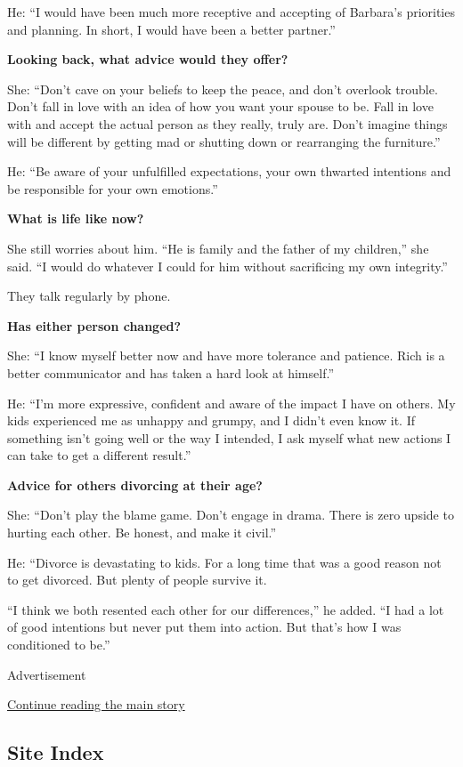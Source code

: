 He: ``I would have been much more receptive and accepting of Barbara's
priorities and planning. In short, I would have been a better partner.''

\textbf{Looking back, what advice would they offer?}

She: ``Don't cave on your beliefs to keep the peace, and don't overlook
trouble. Don't fall in love with an idea of how you want your spouse to
be. Fall in love with and accept the actual person as they really, truly
are. Don't imagine things will be different by getting mad or shutting
down or rearranging the furniture.''

He: ``Be aware of your unfulfilled expectations, your own thwarted
intentions and be responsible for your own emotions.''

\textbf{What is life like now?}

She still worries about him. ``He is family and the father of my
children,'' she said. ``I would do whatever I could for him without
sacrificing my own integrity.''

They talk regularly by phone.

\textbf{Has either person changed?}

She: ``I know myself better now and have more tolerance and patience.
Rich is a better communicator and has taken a hard look at himself.''

He: ``I'm more expressive, confident and aware of the impact I have on
others. My kids experienced me as unhappy and grumpy, and I didn't even
know it. If something isn't going well or the way I intended, I ask
myself what new actions I can take to get a different result.''

\textbf{Advice for others divorcing at their age?}

She: ``Don't play the blame game. Don't engage in drama. There is zero
upside to hurting each other. Be honest, and make it civil.''

He: ``Divorce is devastating to kids. For a long time that was a good
reason not to get divorced. But plenty of people survive it.

``I think we both resented each other for our differences,'' he added.
``I had a lot of good intentions but never put them into action. But
that's how I was conditioned to be.''

Advertisement

\protect\hyperlink{after-bottom}{Continue reading the main story}

\hypertarget{site-index}{%
\subsection{Site Index}\label{site-index}}

